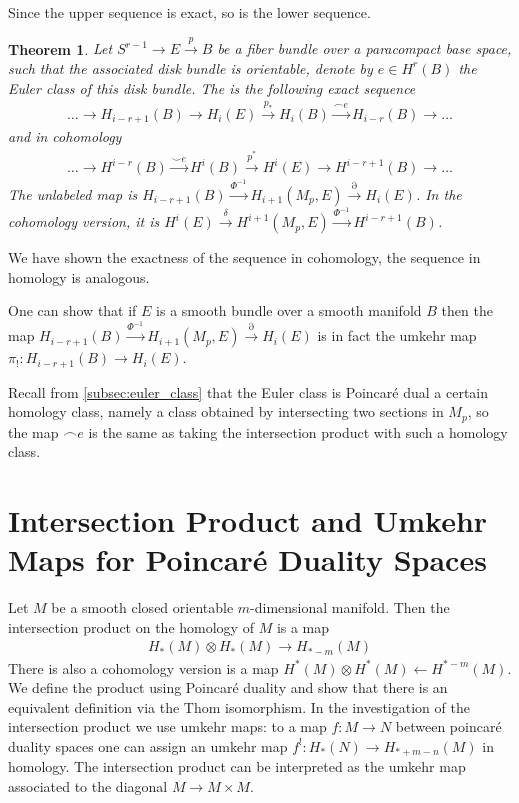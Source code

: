 \documentclass{scrartcl}
\let\emph\relax
\newcommand{\emphi}[1]{\index{#1}\emph{#1}}
\theoremstyle{plain}
\newtheorem{theorem}{Theorem}[section]
\theoremstyle{definition}
\newcommand{\capp}{\mathbin{\frown}}
\newcommand{\cupp}{\mathbin{\smile}}
\newcommand{\from}{\leftarrow}
\begin{document}
Since the upper sequence is exact, so is the lower sequence.

\begin{theorem}
    Let $S^{r-1} \to E \xrightarrow{p} B$ be a fiber bundle over a paracompact base space, such that the associated disk bundle is orientable, denote by $e\in H^r(B)$ the Euler class of this disk bundle. The \emphi{Gysin sequence} is the following exact sequence
    \begin{align*}
        \dots \to H_{i-r+1}(B) \to H_i(E) \xrightarrow{p_*} H_i(B) \xrightarrow{\capp e} H_{i-r}(B) \to \dots
    \end{align*}
    and in cohomology
    \begin{align*}
        \dots \to H^{i-r}(B) \xrightarrow{\cupp e} H^i(B) \xrightarrow{p^*} H^i(E) \to H^{i-r+1}(B)\to \dots
    \end{align*}
    The unlabeled map is $H_{i-r+1}(B) \xrightarrow{\Phi^{-1}} H_{i+1}(M_p, E) \xrightarrow{\partial} H_i(E)$. In the cohomology version, it is $H^i(E) \xrightarrow{\delta} H^{i+1}(M_p, E) \xrightarrow{\Phi^{-1}} H^{i-r+1}(B)$. 
\end{theorem}

We have shown the exactness of the sequence in cohomology, the sequence in homology is analogous. 

One can show that if $E$ is a smooth bundle over a smooth manifold $B$ then the map $H_{i-r+1}(B) \xrightarrow{\Phi^{-1}} H_{i+1}(M_p, E) \xrightarrow{\partial} H_i(E)$ is in fact the umkehr map $\pi_!\colon H_{i-r+1}(B) \to H_i(E)$. 

Recall from \ref{subsec:euler_class} that the Euler class is Poincaré dual a certain homology class, namely a class obtained by intersecting two sections in $M_p$, so the map $\capp e$ is the same as taking the intersection product with such a homology class. 

\section{Intersection Product and Umkehr Maps for Poincaré Duality Spaces}\label{sec:intersection_product}

Let $M$ be a smooth closed orientable $m$-dimensional manifold. Then the intersection product on the homology of $M$ is a map
\begin{align*}
    H_*(M) \otimes H_*(M) \to H_{*-m}(M)
\end{align*}
There is also a cohomology version is a map $H^*(M) \otimes H^*(M) \from H^{*-m}(M)$. We define the product using Poincaré duality and show that there is an equivalent definition via the Thom isomorphism. In the investigation of the intersection product we use umkehr maps: to a map $f\colon M\to N$ between poincaré duality spaces one can assign an umkehr map $f^!\colon H_*(N)\to H_{*+m-n}(M)$ in homology. The intersection product can be interpreted as the umkehr map associated to the diagonal $M\to M\times M$. 
\end{document}
